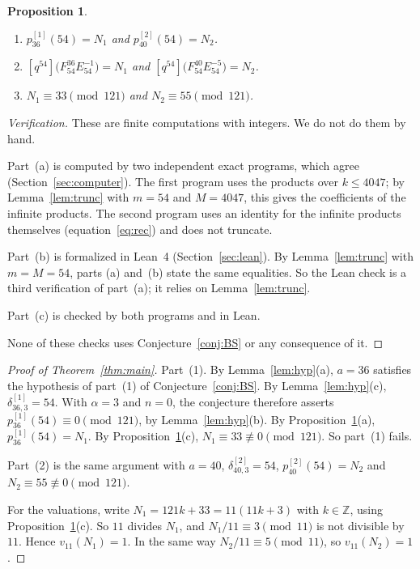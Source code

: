 \documentclass[11pt]{amsart}
\newtheorem{proposition}[theorem]{Proposition}
\theoremstyle{definition}
\theoremstyle{remark}
\newcommand{\Z}{\mathbb{Z}}
\newcommand{\pone}[1]{p^{[1]}_{#1}}
\newcommand{\ptwo}[1]{p^{[2]}_{#1}}
\newcommand{\done}[2]{\delta^{[1]}_{#1,#2}}
\newcommand{\dtwo}[2]{\delta^{[2]}_{#1,#2}}
\newcommand{\cf}[1]{[q^{#1}]}
\newcommand{\val}{v_{11}}
\begin{document}
\begin{proposition}\label{prop:values}
\begin{enumerate}
\item[(a)] \(\pone{36}(54)=N_1\) and \(\ptwo{40}(54)=N_2\).
\item[(b)] \(\cf{54}\bigl(F_{54}^{36}E_{54}^{-1}\bigr)=N_1\) and \(\cf{54}\bigl(F_{54}^{40}E_{54}^{-5}\bigr)=N_2\).
\item[(c)] \(N_1\equiv33\pmod{121}\) and \(N_2\equiv55\pmod{121}\).
\end{enumerate}
\end{proposition}

\begin{proof}[Verification]
These are finite computations with integers. We do not do them by hand.

Part~(a) is computed by two independent exact programs, which agree (Section~\ref{sec:computer}). The first program uses the products over \(k\le4047\); by Lemma~\ref{lem:trunc} with \(m=54\) and \(M=4047\), this gives the coefficients of the infinite products. The second program uses an identity for the infinite products themselves (equation~\eqref{eq:rec}) and does not truncate.

Part~(b) is formalized in Lean~4 (Section~\ref{sec:lean}). By Lemma~\ref{lem:trunc} with \(m=M=54\), parts (a) and~(b) state the same equalities. So the Lean check is a third verification of part~(a); it relies on Lemma~\ref{lem:trunc}.

Part~(c) is checked by both programs and in Lean.

None of these checks uses Conjecture~\ref{conj:BS} or any consequence of it.
\end{proof}

\begin{proof}[Proof of Theorem~\ref{thm:main}]
Part~(1). By Lemma~\ref{lem:hyp}(a), \(a=36\) satisfies the hypothesis of part~(1) of Conjecture~\ref{conj:BS}. By Lemma~\ref{lem:hyp}(c), \(\done{36}{3}=54\). With \(\alpha=3\) and \(n=0\), the conjecture therefore asserts \(\pone{36}(54)\equiv0\pmod{121}\), by Lemma~\ref{lem:hyp}(b). By Proposition~\ref{prop:values}(a), \(\pone{36}(54)=N_1\). By Proposition~\ref{prop:values}(c), \(N_1\equiv33\not\equiv0\pmod{121}\). So part~(1) fails.

Part~(2) is the same argument with \(a=40\), \(\dtwo{40}{3}=54\), \(\ptwo{40}(54)=N_2\) and \(N_2\equiv55\not\equiv0\pmod{121}\).

For the valuations, write \(N_1=121k+33=11(11k+3)\) with \(k\in\Z\), using Proposition~\ref{prop:values}(c). So \(11\) divides \(N_1\), and \(N_1/11\equiv3\pmod{11}\) is not divisible by \(11\). Hence \(\val(N_1)=1\). In the same way \(N_2/11\equiv5\pmod{11}\), so \(\val(N_2)=1\).
\end{proof}
\end{document}

